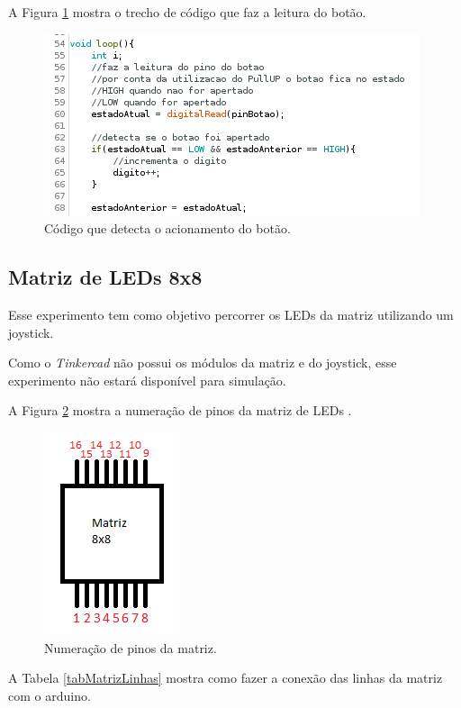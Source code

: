 \documentclass[12pt]{article}
\begin{document}
	A Figura \ref{figExp4botao} mostra o trecho de código que faz a leitura do botão.

	\begin{figure}[H]
		\centering
		\includegraphics[scale=0.65]{Imagens/Experimentos/4-Display7Seg/codigoBotao.png}
		\caption{Código que detecta o acionamento do botão.}
		\label{figExp4botao}
	\end{figure}

\subsection{Matriz de LEDs 8x8}
Esse experimento tem como objetivo percorrer os LEDs da matriz utilizando um joystick.

Como o \textit{Tinkercad} não possui os módulos da matriz e do joystick, esse experimento não estará disponível para simulação.

A Figura \ref{figPinosMatriz} mostra a numeração de pinos da matriz de LEDs \cite{siteLEDMatrix}.

\begin{figure}[H]
	\centering
	\includegraphics[scale=0.7]{Imagens/Experimentos/5-LEDMatrix/pinosMatriz.png}
	\caption{Numeração de pinos da matriz.}
	\label{figPinosMatriz}
\end{figure}

A Tabela \ref{tabMatrizLinhas} mostra como fazer a conexão das linhas da matriz com o arduino.
\end{document}
